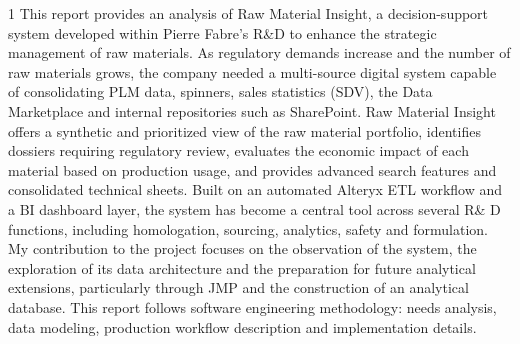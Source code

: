\begin{titlepage}
\vspace{0.75cm}
\begin{spacing}{1}
This report provides an analysis of Raw Material Insight, a decision-support system developed within Pierre Fabre’s R\&D to enhance the strategic management of raw materials. As regulatory demands increase and the number of raw materials grows, the company needed a multi-source digital system capable of consolidating PLM data, spinners, sales statistics (SDV), the Data Marketplace and internal repositories such as SharePoint.
Raw Material Insight offers a synthetic and prioritized view of the raw material portfolio, identifies dossiers requiring regulatory review, evaluates the economic impact of each material based on production usage, and provides advanced search features and consolidated technical sheets. Built on an automated Alteryx ETL workflow and a BI dashboard layer, the system has become a central tool across several R\& D functions, including homologation, sourcing, analytics, safety and formulation.
My contribution to the project focuses on the observation of the system, the exploration of its data architecture and the preparation for future analytical extensions, particularly through JMP and the construction of an analytical database.
This report follows software engineering methodology: needs analysis, data modeling, production workflow description and implementation details.

\end{spacing}
\end{titlepage}